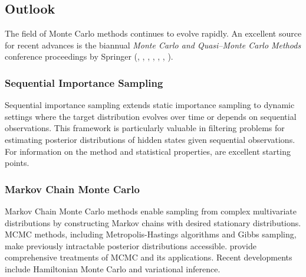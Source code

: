 \subsection{Outlook}
\label{outlook}
The field of Monte Carlo methods continues to evolve rapidly. An excellent source for recent advances is the biannual \textit{Monte Carlo and Quasi–Monte Carlo Methods} conference proceedings by Springer (\cite{plaskota_monte_2012}, \cite{dick_monte_2013}, \cite{cools_monte_2016}, \cite{owen_monte_2018}, \cite{tuffin_monte_2020}, \cite{keller_monte_2022}, \cite{hinrichs_monte_2024}).

\subsubsection{Sequential Importance Sampling}
\label{sis}
Sequential importance sampling extends static importance sampling to dynamic settings where the target distribution evolves over time or depends on sequential observations. This framework is particularly valuable in filtering problems for estimating posterior distributions of hidden states given sequential observations. For information on the method and statistical properties, \cite{murphy_probabilistic_2023, barbu_monte_2020} are excellent starting points.

\subsubsection{Markov Chain Monte Carlo}
\label{mcmc}
Markov Chain Monte Carlo methods enable sampling from complex multivariate distributions by constructing Markov chains with desired stationary distributions. MCMC methods, including Metropolis-Hastings algorithms and Gibbs sampling, make previously intractable posterior distributions accessible. \cite{barbu_monte_2020, murphy_probabilistic_2023} provide comprehensive treatments of MCMC and its applications. Recent developments include Hamiltonian Monte Carlo and variational inference.




